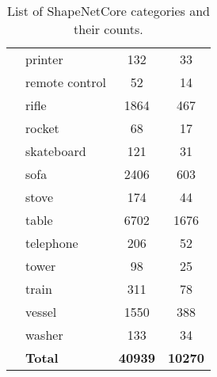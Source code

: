 \begin{table}[]
\begin{tabular}[t]{llcc}
		             & printer           & 132            & 33             \\
		             & remote control    & 52             & 14             \\
		             & rifle             & 1864           & 467            \\
		             & rocket            & 68             & 17             \\
		             & skateboard        & 121            & 31             \\
		             & sofa              & 2406           & 603            \\
		             & stove             & 174            & 44             \\
		             & table             & 6702           & 1676           \\
		             & telephone         & 206            & 52             \\
		             & tower             & 98             & 25             \\
		             & train             & 311            & 78             \\
		             & vessel            & 1550           & 388            \\
		             & washer            & 133            & 34             \\
		             & \textbf{Total}    & \textbf{40939} & \textbf{10270} \\ \hline
	\end{tabular}
	
	
	\caption{List of ShapeNetCore categories and their counts.}
	\label{Table:shapenetcats}
\end{table}